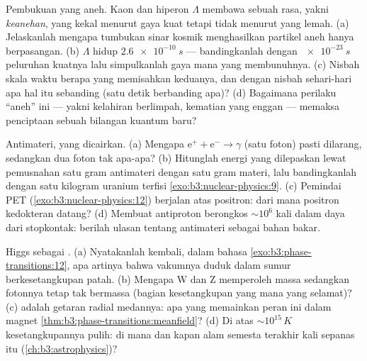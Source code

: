 \begin{exercise}[$\star\star$]\label{exo:b3:particle-physics:7}
Pembukuan yang aneh. Kaon dan hiperon $\Lambda$ membawa sebuah
rasa, yakni \emph{keanehan}, yang kekal menurut gaya kuat tetapi
tidak menurut yang lemah. (a) Jelaskanlah mengapa tumbukan sinar kosmik menghasilkan
partikel aneh hanya berpasangan. (b) $\Lambda$ hidup
$\qty{2.6e-10}{s}$ --- bandingkanlah dengan $\qty{e-23}{s}$ peluruhan
kuatnya lalu simpulkanlah gaya mana yang membunuhnya. (c) Nisbah
skala waktu berapa yang memisahkan keduanya, dan dengan nisbah sehari-hari apa
hal itu sebanding (satu detik berbanding apa)? (d) Bagaimana perilaku
``aneh'' ini --- yakni kelahiran berlimpah, kematian yang enggan ---
memaksa penciptaan sebuah bilangan kuantum baru?
\end{exercise}

\begin{exercise}[$\star\star$]\label{exo:b3:particle-physics:8}
Antimateri, yang dicairkan. (a) Mengapa
$\text{e}^+ + \text{e}^- \to \gamma$ (satu foton) pasti dilarang,
sedangkan dua foton tak apa-apa? (b) Hitunglah energi yang dilepaskan lewat
pemusnahan satu gram antimateri dengan satu gram materi, lalu
bandingkanlah dengan satu kilogram uranium terfisi
\cref{exo:b3:nuclear-physics:9}. (c) Pemindai PET
(\cref{exo:b3:nuclear-physics:12}) berjalan atas positron: dari mana
positron kedokteran datang? (d) Membuat antiproton berongkos
$\sim10^{6}$ kali  dalam daya dari stopkontak: berilah ulasan
tentang antimateri sebagai bahan bakar.
\end{exercise}

\begin{exercise}[$\star\star\star$]\label{exo:b3:particle-physics:9}
Higgs sebagai . (a) Nyatakanlah kembali, dalam bahasa
\cref{exo:b3:phase-transitions:12}, apa artinya bahwa
vakumnya duduk dalam sumur berkesetangkupan patah. (b) Mengapa W dan Z
memperoleh massa sedangkan fotonnya tetap tak bermassa (bagian kesetangkupan
yang mana yang selamat)? (c)  adalah getaran radial medannya:
apa yang memainkan peran ini dalam magnet
\cref{thm:b3:phase-transitions:meanfield}? (d) Di atas
$\sim10^{15}\,\unit{K}$ kesetangkupannya pulih: di mana dan kapan
alam semesta terakhir kali sepanas itu (\cref{ch:b3:astrophysics})?
\end{exercise}

